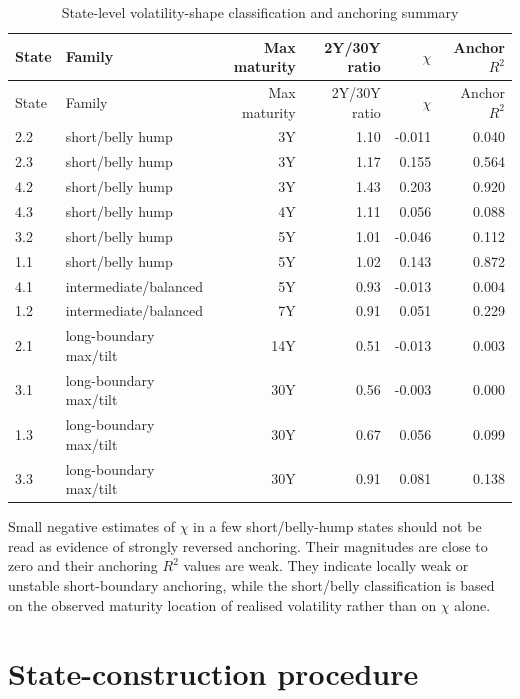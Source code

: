 \documentclass[11pt]{article}
\newcommand{\Rtwo}{R^2}
\begin{document}
\begin{longtable}{llrrrr}
\caption{State-level volatility-shape classification and anchoring summary}\label{tab:state_vol_groups}\\
\toprule
State & Family & Max maturity & 2Y/30Y ratio & $\chi$ & Anchor $\Rtwo$ \\
\midrule
\endfirsthead
\toprule
State & Family & Max maturity & 2Y/30Y ratio & $\chi$ & Anchor $\Rtwo$ \\
\midrule
\endhead
2.2 & short/belly hump & 3Y & 1.10 & -0.011 & 0.040 \\
2.3 & short/belly hump & 3Y & 1.17 & 0.155 & 0.564 \\
4.2 & short/belly hump & 3Y & 1.43 & 0.203 & 0.920 \\
4.3 & short/belly hump & 4Y & 1.11 & 0.056 & 0.088 \\
3.2 & short/belly hump & 5Y & 1.01 & -0.046 & 0.112 \\
1.1 & short/belly hump & 5Y & 1.02 & 0.143 & 0.872 \\
4.1 & intermediate/balanced & 5Y & 0.93 & -0.013 & 0.004 \\
1.2 & intermediate/balanced & 7Y & 0.91 & 0.051 & 0.229 \\
2.1 & long-boundary max/tilt & 14Y & 0.51 & -0.013 & 0.003 \\
3.1 & long-boundary max/tilt & 30Y & 0.56 & -0.003 & 0.000 \\
1.3 & long-boundary max/tilt & 30Y & 0.67 & 0.056 & 0.099 \\
3.3 & long-boundary max/tilt & 30Y & 0.91 & 0.081 & 0.138 \\
\bottomrule
\end{longtable}

Small negative estimates of $\chi$ in a few short/belly-hump states should not be read as evidence of strongly reversed anchoring. Their magnitudes are close to zero and their anchoring $\Rtwo$ values are weak. They indicate locally weak or unstable short-boundary anchoring, while the short/belly classification is based on the observed maturity location of realised volatility rather than on $\chi$ alone.

\section{State-construction procedure}
\end{document}
